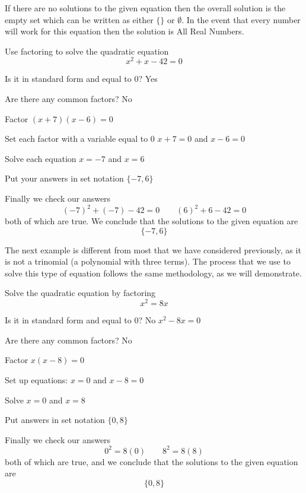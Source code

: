 If there are no solutions to the given equation then the overall \gls{solution} is the empty set which
can be written as either $\{\}$ or $\emptyset$. In the event that every number will work for this equation
then the solution is All Real Numbers.

\begin{myexample}
Use factoring to solve the quadratic equation
\[
	x^2+x-42 = 0
\]
\end{myexample}
\begin{myProof}
	\begin{steps}
		\item Is it in standard form and equal to 0?     \hfill Yes               
		\item	Are there any common factors?              \hfill No                
		\item	Factor                                     \hfill $(x+7)(x-6)=0$        
		\item	Set each factor with a variable equal to 0 \hfill $x+7=0$  and  $x-6=0$ 
		\item	Solve each equation                        \hfill $x=-7$  and  $x=6$    
		\item	Put your answers in set notation           \hfill $\{-7,6\}$
		\item	Finally we check our answers
		\[
			(-7)^2+(-7)-42 = 0 \qquad (6)^2+6-42 = 0
		\]
		both of which are true. We conclude that the solutions to the given equation are
		\[
			\{-7,6\}
		\]
	\end{steps}
	{}
\end{myProof}

The next example is different from most that we have considered previously, as it is not a trinomial
(a polynomial with three terms). The process that we use to solve this type of equation follows the 
same methodology, as we will demonstrate.

\begin{myexample}
Solve the quadratic equation by factoring
\[
	x^2=8x
\]
\end{myexample}
\begin{myProof}
	\begin{steps}
		\item Is it in standard form and equal to 0? \hfill No  $x^2-8x=0$
		\item	Are there any common factors?          \hfill No              
		\item	Factor                                 \hfill $x(x-8)=0$          
		\item	Set up equations:                      \hfill $x=0$  and  $x-8=0$ 
		\item	Solve                                  \hfill $x=0$  and  $x=8$   
		\item	Put answers in set notation            \hfill $\{0,8\}$           
		\item	Finally we check our answers
		\[
			0^2 = 8(0) \qquad 8^2 = 8(8)
		\]
		both of which are true, and we conclude that the solutions to the given equation are
		\[
			\{0,8\}
		\]
	\end{steps}
	{}
\end{myProof} 


